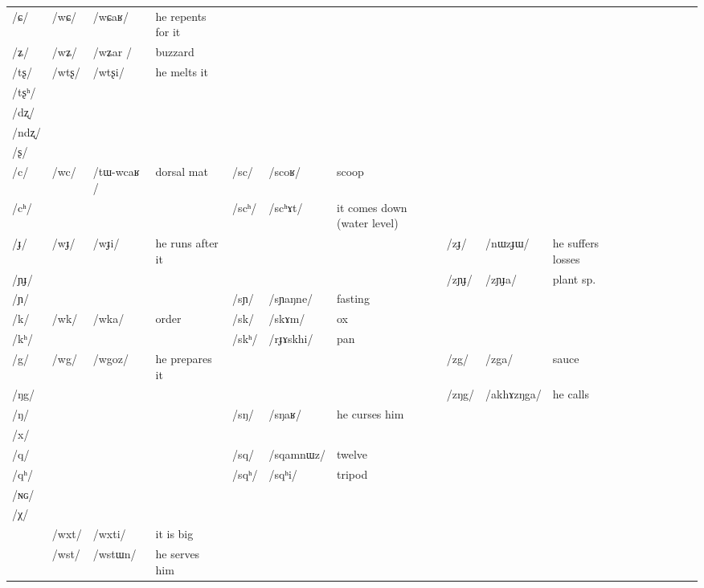 \documentclass[oldfontcommands,oneside,a4paper,11pt]{article}
\newcommand{\ipa}[1]{/#1/} %
\newcommand{\deux}[1]{/#1/}
\newcommand{\trois}[1]{/#1/}
\newcommand{\tib}[1]{\cellcolor{lightgray}\textbf{#1}}
\begin{document}
\begin{table}
{\begin{tabular}{l|lll|lll|lll|lllllll}
\ipa{ɕ}  &	\deux{wɕ}  &	\ipa{wɕaʁ}  &he repents for it&	  &	  &	&	  &	  &	&	\\	
\ipa{ʑ}  &	\deux{wʑ}  &	\ipa{wʑar }  &	buzzard&	  &	  &	&	  &	  &	&	\\
\ipa{tʂ}  &	\deux{wtʂ}  &	\ipa{wtʂi}  & he melts it	&	  &	  &	&	  &	  &	&	\\
\ipa{tʂʰ}  &	  &	  &	&	  &	  &	&	  &	  &	&	\\
\ipa{dʐ}  &	  &	  &	&	  &	  &	&	  &	  &	&	\\
\ipa{ndʐ}  &	  &	  &	&	  &	  &	&	  &	  &	&	\\
\ipa{ʂ}  &	  &	  &	&	  &	  &	&	  &	  &	&	\\
\ipa{c}  &	\deux{wc}  &	\ipa{tɯ-wcaʁ }  &dorsal mat	&	\deux{sc}  &	\ipa{scoʁ}  &scoop	&	  &	  &	&	\\
\ipa{cʰ}  &	  &	  &	&	\deux{scʰ}  &	\ipa{scʰɤt}  &	it comes down (water level)&	  &	  &	&	\\
\ipa{ɟ}  &	\deux{wɟ}  &	\ipa{wɟi}  &he runs after it	&	  &	  &	&	\deux{zɟ}  &	\ipa{nɯzɟɯ}  &	he suffers losses&	\\
\ipa{ɲɟ}  &	  &	  &	&	  &	  &	&	\deux{zɲɟ}  &	\ipa{zɲɟa}  &	plant sp.&	\\
\ipa{ɲ}  &	  &	  &	&	\deux{sɲ}  &	\ipa{sɲaŋne}  &fasting	&	   &	 &	&	\\
\ipa{k}  &	\deux{wk}  &	\ipa{wka}  &	order&	\deux{sk}  &	\ipa{skɤm}  &	ox&	  &	  &	&	\\
\ipa{kʰ}  &	  &	  &	&	\deux{skʰ}  &	\ipa{rɟɤskhi}  &pan	&	  &	  &	&	\\
\ipa{g}  &	\deux{wg}  \tib{}&	\ipa{wgoz}  &	he prepares it&	  &	  &	& 	\deux{zg}  &	\ipa{zga}  &	sauce&	\\
\ipa{ŋg}  &	  &	  &	&	  &	  &	&	\deux{zŋg}  &	\ipa{akhɤzŋga}  &	he calls&	\\
\ipa{ŋ}  &	  &	  &	&	\deux{sŋ}  &	\ipa{sŋaʁ}  &	he curses him&	  &	  &	&	\\
\ipa{x}  &	  &	  &	&	  &	  &	&	  &	  &	&	\\
\ipa{q}  &	  &	  &	&	\deux{sq}  &	\ipa{sqamnɯz}  &	twelve&	  &	  &	&	\\
\ipa{qʰ}  &	  &	  &	&	\deux{sqʰ}  &	\ipa{sqʰi}  &	tripod&	  &	  &	&	\\
\ipa{ɴɢ}  &	  &	  &	&	  &	  &	&	  &	  &	&	\\
\ipa{χ}  &	  &	  &	&	  &	  &	&	  &	  &	&	\\
\midrule
&	\trois{wxt}  &	\ipa{wxti}  &it is big	\\
&	\trois{wst} \tib{} &	\ipa{wstɯn}  &he serves him	\\

\end{tabular}}
\end{table}
\end{document}
